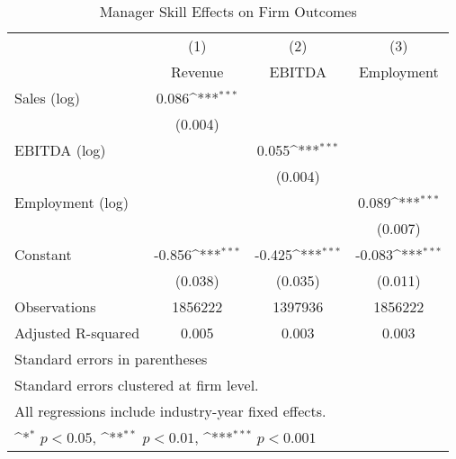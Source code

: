 \begin{table}[htbp]\centering
\def\sym#1{\ifmmode^{#1}\else\(^{#1}\)\fi}
\caption{Manager Skill Effects on Firm Outcomes}
\begin{tabular}{l*{3}{c}}
\toprule
                    &\multicolumn{1}{c}{(1)}&\multicolumn{1}{c}{(2)}&\multicolumn{1}{c}{(3)}\\
                    &\multicolumn{1}{c}{Revenue}&\multicolumn{1}{c}{EBITDA}&\multicolumn{1}{c}{Employment}\\
\midrule
Sales (log)         &       0.086\sym{***}&                     &                     \\
                    &     (0.004)         &                     &                     \\
\addlinespace
EBITDA (log)        &                     &       0.055\sym{***}&                     \\
                    &                     &     (0.004)         &                     \\
\addlinespace
Employment (log)    &                     &                     &       0.089\sym{***}\\
                    &                     &                     &     (0.007)         \\
\addlinespace
Constant            &      -0.856\sym{***}&      -0.425\sym{***}&      -0.083\sym{***}\\
                    &     (0.038)         &     (0.035)         &     (0.011)         \\
\midrule
Observations        &     1856222         &     1397936         &     1856222         \\
Adjusted R-squared  &       0.005         &       0.003         &       0.003         \\
\bottomrule
\multicolumn{4}{l}{\footnotesize Standard errors in parentheses}\\
\multicolumn{4}{l}{\footnotesize Standard errors clustered at firm level.}\\
\multicolumn{4}{l}{\footnotesize All regressions include industry-year fixed effects.}\\
\multicolumn{4}{l}{\footnotesize \sym{*} \(p<0.05\), \sym{**} \(p<0.01\), \sym{***} \(p<0.001\)}\\
\end{tabular}
\end{table}
